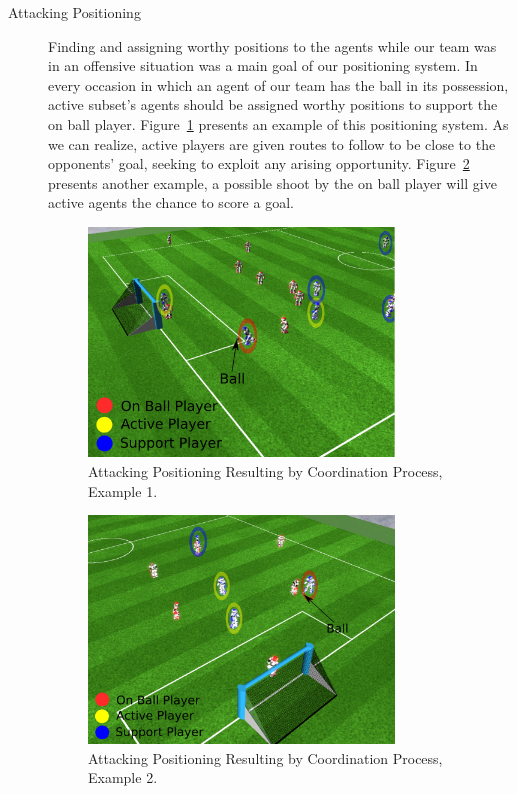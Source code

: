 \begin{description}
\item[Attacking Positioning]
Finding and assigning worthy positions to the agents while our team was in an offensive situation was a main goal of our positioning system. In every occasion in which an agent of our team has the ball in its possession, active subset's agents should be assigned worthy positions to support the on ball player. Figure~\ref{fig:AttackingPositioning1} presents an example of this positioning system. As we can realize, active players are given routes to follow to be close to the opponents' goal, seeking to exploit any arising opportunity. Figure~\ref{fig:AttackingPositioning2} presents another example, a possible shoot by the on ball player will give active agents the chance to score a goal.


\begin{figure}[t!]
\centering
  \includegraphics[width=0.8\textwidth]{Chapter5/figures/3.pdf}
  \caption{Attacking Positioning Resulting by Coordination Process, Example 1.} 
  \label{fig:AttackingPositioning1}
\end{figure}

\begin{figure}[t!]
\centering
  \includegraphics[width=0.8\textwidth]{Chapter5/figures/5.pdf}
  \caption{Attacking Positioning Resulting by Coordination Process, Example 2.} 
  \label{fig:AttackingPositioning2}
\end{figure}



\end{description}
